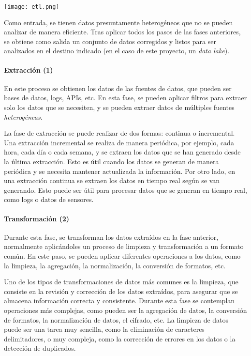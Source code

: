 \begin{minipage}{\linewidth}
	\centering
	\texttt{[image: etl.png]}
\end{minipage}

Como entrada, se tienen datos presuntamente heterogéneos que no se pueden analizar de manera eficiente.
Tras aplicar todos los pasos de las fases anteriores, se obtiene como salida un conjunto de
datos corregidos y listos para ser analizados en el destino indicado (en el caso de este proyecto,
un \emph{data lake}).

\paragraph{Extracción (1)}
En este proceso se obtienen los datos de las fuentes de datos, que pueden ser bases de datos, logs,
APIs, etc. En esta fase, se pueden aplicar filtros para extraer solo los datos que se necesiten, y
se pueden extraer datos de múltiples fuentes \emph{heterogéneas}.

La fase de extracción se puede realizar de dos formas: continua o incremental. Una extracción incremental se
realiza de manera periódica, por ejemplo, cada hora, cada día o cada semana, y se extraen los datos
que se han generado desde la última extracción. Esto es útil cuando los datos se generan de manera
periódica y se necesita mantener actualizada la información. Por otro lado, en una extracción continua se
extraen los datos en tiempo real según se van generando. Esto puede ser útil para procesar datos que se generan
en tiempo real, como logs o datos de sensores.

\newpage{}
\paragraph{Transformación (2)}
Durante esta fase, se transforman los datos extraídos en la fase anterior, normalmente aplicándoles
un proceso de limpieza y transformación a un formato común. En este paso, se pueden aplicar
diferentes operaciones a los datos, como la limpieza, la agregación, la normalización, la conversión
de formatos, etc.

Uno de los tipos de transformaciones de datos más comunes es la limpieza, que consiste en la
revisión y corrección de los datos extraídos, para asegurar que se almacena información correcta y
consistente. Durante esta fase se contemplan operaciones más complejas, como pueden ser la agregación
de datos, la conversión de formatos, la normalización de datos, el cifrado, etc. La limpieza de datos puede
ser una tarea muy sencilla, como la eliminación de caracteres delimitadores, o muy compleja, como la
corrección de errores en los datos o la detección de duplicados.

